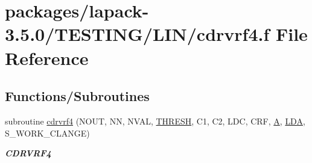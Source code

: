 \hypertarget{cdrvrf4_8f}{}\section{packages/lapack-\/3.5.0/\+T\+E\+S\+T\+I\+N\+G/\+L\+I\+N/cdrvrf4.f File Reference}
\label{cdrvrf4_8f}
\subsection*{Functions/\+Subroutines}
\begin{DoxyCompactItemize}
\item 
subroutine \hyperlink{group__complex__lin_gaec50978389bc2aaf96c22b635ac099d7}{cdrvrf4} (N\+O\+U\+T, N\+N, N\+V\+A\+L, \hyperlink{zlaqgs_8c_a0656018abfc9fa2821827415f5d5ea57}{T\+H\+R\+E\+S\+H}, C1, C2, L\+D\+C, C\+R\+F, \hyperlink{classA}{A}, \hyperlink{example__user_8c_ae946da542ce0db94dced19b2ecefd1aa}{L\+D\+A}, S\+\_\+\+W\+O\+R\+K\+\_\+\+C\+L\+A\+N\+G\+E)
\begin{DoxyCompactList}\small\item\em {\bfseries C\+D\+R\+V\+R\+F4} \end{DoxyCompactList}\end{DoxyCompactItemize}
